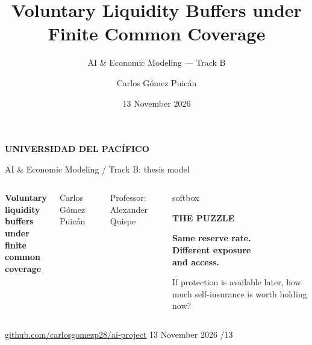 \documentclass[aspectratio=169,12pt]{beamer}
\title{Voluntary Liquidity Buffers under Finite Common Coverage}
\subtitle{AI \& Economic Modeling --- Track B}
\author{Carlos G\'omez Puic\'an}
\institute{Universidad del Pac\'ifico}
\date{13 November 2026}
\newcommand{\eyebrow}[1]{{\scriptsize\bfseries\color{upblue}#1\par\vspace{.10cm}}}
\begin{document}
\begin{frame}[plain]
\relax
\vspace{.10cm}
{\small\bfseries\color{upblue}UNIVERSIDAD DEL PAC\'IFICO}\par
{\scriptsize\color{muted}AI \& Economic Modeling \quad / \quad Track B: thesis model}
\vspace{.42cm}
\begin{columns}[c,onlytextwidth]
{\fontsize{25}{29}\selectfont\bfseries\color{navy}
Voluntary liquidity\\[3pt]
buffers under finite\\[3pt]
common coverage\par}
\vspace{.28cm}
{\normalsize Carlos G\'omez Puic\'an}\par
{\small\color{muted}Professor: Alexander Quispe}
\begin{beamercolorbox}[wd=\linewidth,sep=.22cm]{softbox}
\eyebrow{THE PUZZLE}
{\large\bfseries\color{navy}Same reserve rate.\\Different exposure\\and access.}\par
\vspace{.18cm}
{\small If protection is available later, how much self-insurance is worth holding now?}
\end{beamercolorbox}
\end{columns}
\vfill
{\scriptsize\href{https://github.com/carlosgomezp28/ai-project}{\color{upblue}github.com/carlosgomezp28/ai-project}
\hfill\color{muted}13 November 2026 /13}
\end{frame}
\end{document}
